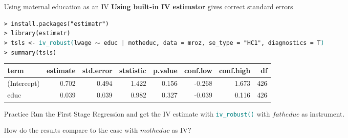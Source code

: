\documentclass[11pt, aspectratio = 169]{beamer}
\begin{document}
\begin{frame}[fragile]{Using maternal education as an IV}
\textbf{Using built-in IV estimator} gives correct standard errors
\small

\texttt{> install.packages("estimatr") \\
> library(estimatr) \\
> tsls <- \textcolor{teal}{iv\_robust(}lwage $\sim$ educ | motheduc, data = mroz, 
         se\_type = "HC1", diagnostics = T\textcolor{teal}{)} \\
> summary(tsls)}

\begin{tabular}{l|rrrrrrr}
\hline
term & estimate & std.error & statistic & p.value & conf.low & conf.high & df \\
\hline
(Intercept) & 0.702 & 0.494 & 1.422 & 0.156 & -0.268 & 1.673 & 426 \\
educ & 0.039 & 0.039 & 0.982 & 0.327 & -0.039 & 0.116 & 426 \\
\hline
\end{tabular}

\end{frame}

\begin{frame}{Practice}
    Run the First Stage Regression and get the IV estimate with  \texttt{\textcolor{teal}{iv\_robust()}} with $fatheduc$ as instrument.
    
    How do the results compare to the case with $motheduc$ as IV?
\end{frame}
\end{document}
